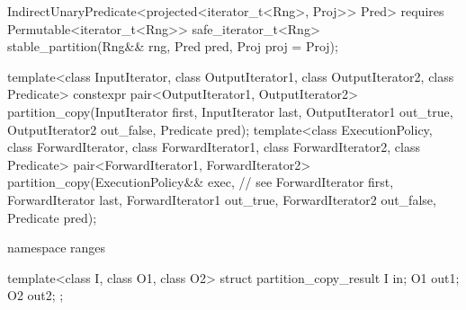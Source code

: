 \begin{addedblock}
\begin{codeblock}
{        IndirectUnaryPredicate<projected<iterator_t<Rng>, Proj>> Pred>
      requires Permutable<iterator_t<Rng>>
      safe_iterator_t<Rng> stable_partition(Rng&& rng, Pred pred, Proj proj = Proj{});
  }
\end{codeblock}\end{addedblock}\begin{codeblock}
  template<class InputIterator, class OutputIterator1,
           class OutputIterator2, class Predicate>
    constexpr pair<OutputIterator1, OutputIterator2>
      partition_copy(InputIterator first, InputIterator last,
                     OutputIterator1 out_true, OutputIterator2 out_false,
                     Predicate pred);
  template<class ExecutionPolicy, class ForwardIterator, class ForwardIterator1,
           class ForwardIterator2, class Predicate>
    pair<ForwardIterator1, ForwardIterator2>
      partition_copy(ExecutionPolicy&& exec, // see 
                     ForwardIterator first, ForwardIterator last,
                     ForwardIterator1 out_true, ForwardIterator2 out_false,
                     Predicate pred);
\end{codeblock}\begin{addedblock}\begin{codeblock}
  namespace ranges {
    template<class I, class O1, class O2>
    struct partition_copy_result {
      I  in;
      O1 out1;
      O2 out2;
    };

}
\end{codeblock}
\end{addedblock}
